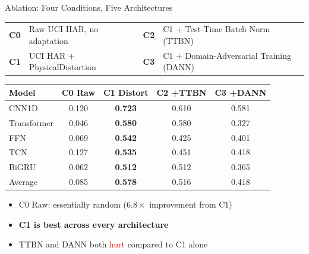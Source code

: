 \documentclass{beamer}
\begin{document}
\begin{frame}[shrink=5]{Ablation: Four Conditions, Five Architectures}

{\footnotesize
\begin{tabular}{@{}ll@{\quad}ll@{}}
  \textbf{C0} & Raw UCI HAR, no adaptation &
  \textbf{C2} & C1 + Test-Time Batch Norm (TTBN) \\
  \textbf{C1} & UCI HAR + PhysicalDistortion &
  \textbf{C3} & C1 + Domain-Adversarial Training (DANN) \\
\end{tabular}
}

\smallskip
\begin{table}
\centering
\small
\begin{tabular}{lcccc}
\toprule
Model & C0 Raw & C1 Distort & C2 +TTBN & C3 +DANN \\
\midrule
CNN1D       & 0.120 & \textbf{0.723} & 0.610 & 0.581 \\
Transformer & 0.046 & \textbf{0.580} & 0.580 & 0.327 \\
FFN         & 0.069 & \textbf{0.542} & 0.425 & 0.401 \\
TCN         & 0.127 & \textbf{0.535} & 0.451 & 0.418 \\
BiGRU       & 0.062 & \textbf{0.512} & 0.512 & 0.365 \\
\midrule
Average     & 0.085 & \textbf{0.578} & 0.516 & 0.418 \\
\bottomrule
\end{tabular}
\end{table}

\bigskip
\begin{itemize}
    \item C0 Raw: essentially random ($6.8\times$ improvement from C1)
    \item \textbf{C1 is best across every architecture}
    \item TTBN and DANN both \textcolor{red}{hurt} compared to C1 alone
\end{itemize}

\end{frame}
\end{document}
